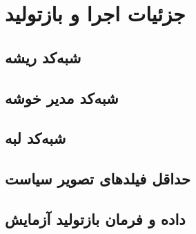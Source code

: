 \chapter{جزئیات اجرا و بازتولید}

\section{شبه‌کد ریشه}

\section{شبه‌کد مدیر خوشه}

\section{شبه‌کد لبه}

\section{حداقل فیلدهای تصویر سیاست}

\section{داده و فرمان بازتولید آزمایش}
